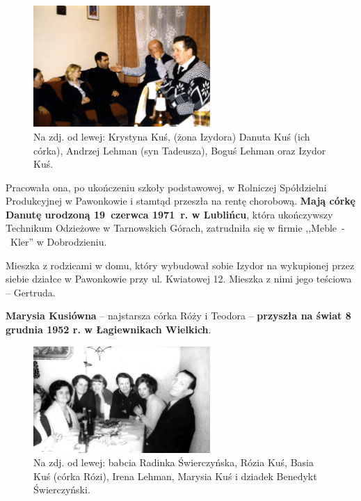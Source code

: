 \begin{figure}[!h]
\begin{center}
\includegraphics[width=0.6\textwidth]{photo/izydor_krystyna_kus_1.jpg}
\caption[Izydor Kuś]{Na zdj. od lewej: Krystyna Kuś, (żona Izydora) Danuta Kuś (ich córka), Andrzej Lehman (syn Tadeusza), Boguś Lehman oraz Izydor Kuś.}
\label{rys:izydor_krystyna_kus_1}
\end{center}
\end{figure}

Pracowała ona, po ukończeniu szkoły podstawowej, w Rolniczej Spółdzielni Produkcyjnej w Pawonkowie i stamtąd przeszła na rentę chorobową. \textbf{Mają córkę Danutę urodzoną 19~czerwca 1971~r. w Lublińcu}, która ukończywszy Technikum Odzieżowe w Tarnowskich Górach, zatrudniła się w firmie ,,Meble~-~Kler'' w Dobrodzieniu.

Mieszka z rodzicami w domu, który wybudował sobie Izydor na wykupionej przez siebie działce w Pawonkowie przy ul. Kwiatowej 12. Mieszka z nimi jego teściowa -- Gertruda.

\textbf{Marysia Kusiówna} -- najstarsza córka Róży i Teodora -- \textbf{przyszła na świat 8 grudnia 1952 r. w Łagiewnikach Wielkich}.
\begin{figure}[!h]
\begin{center}
\includegraphics[width=0.6\textwidth]{photo/maria_kus_1.jpg}
\caption[Marysia Kuś]{Na zdj. od lewej: babcia Radinka Świerczyńska, Rózia Kuś, Basia Kuś (córka Rózi), Irena Lehman, Marysia Kuś i dziadek Benedykt Świerczyński.}
\label{rys:maria_kus_1}
\end{center}
\end{figure}

